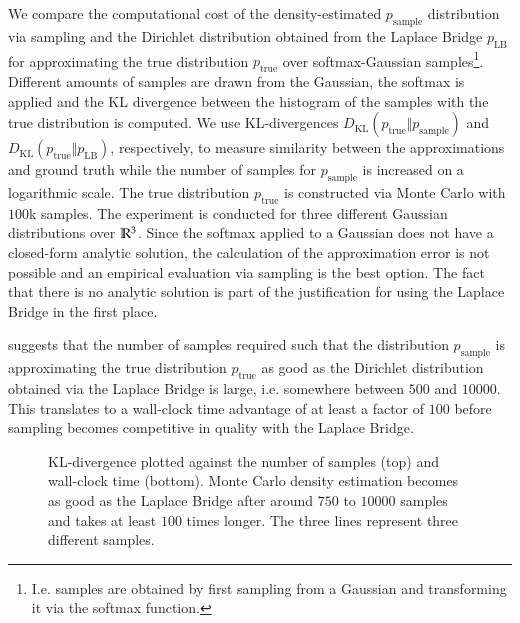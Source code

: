 We compare the computational cost of the density-estimated $p_\text{sample}$ distribution via sampling and the Dirichlet distribution obtained from the Laplace Bridge $p_\text{LB}$ for approximating the true distribution $p_\text{true}$ over softmax-Gaussian samples\footnote{I.e. samples are obtained by first sampling from a Gaussian and transforming it via the softmax function.}. Different amounts of samples are drawn from the Gaussian, the softmax is applied and the KL divergence between the histogram of the samples with the true distribution is computed. We use KL-divergences $D_\text{KL}(p_\text{true} \Vert p_\text{sample})$ and $D_\text{KL}(p_\text{true} \Vert p_\text{LB})$, respectively, to measure similarity between the approximations and ground truth while the number of samples for $p_\text{sample}$ is increased on a logarithmic scale. The true distribution $p_\text{true}$ is constructed via Monte Carlo with $100$k samples. The experiment is conducted for three different Gaussian distributions over $\mathbb{R}^3$. Since the softmax applied to a Gaussian does not have a closed-form analytic solution, the calculation of the approximation error is not possible and an empirical evaluation via sampling is the best option. The fact that there is no analytic solution is part of the justification for using the Laplace Bridge in the first place.

 suggests that the number of samples required such that the distribution $p_\text{sample}$ is approximating the true distribution $p_\text{true}$ as good as the Dirichlet distribution obtained via the Laplace Bridge is large, i.e. somewhere between $500$ and $10000$. This translates to a wall-clock time advantage of at least a factor of $100$ before sampling becomes competitive in quality with the Laplace Bridge.


\setlength{\figwidth}{0.8\textwidth}
\setlength{\figheight}{0.3\textheight}

\begin{figure}[h!]
    \scriptsize

    \hspace{2em}

    \vspace{2em}

    \hspace{2em}

	\centering
	\caption{KL-divergence plotted against the number of samples (top) and wall-clock time (bottom). Monte Carlo density estimation becomes as good as the Laplace Bridge after around $750$ to $10000$ samples and takes at least $100$ times longer. The three lines represent three different samples.}
	\label{fig:KL_div_samples}
\end{figure}


